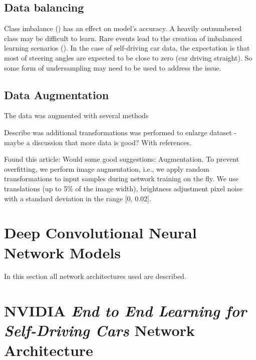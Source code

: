 \subsection{Data balancing}

Class imbalance (\cite{batista2004study}) has an effect on model's accuracy. A heavily outnumbered class may be difficult to learn. Rare events lead to the creation of imbalanced learning scenarios (\cite{krawczyk2016learning}). In the case of self-driving car data, the expectation is that most of steering angles are expected to be close to zero (car driving straight). So some form of undersampling may need to be used to address the issue.






\subsection{Data Augmentation}
The data was augmented with several methods

Describe was additional transformations was performed to enlarge dataset - maybe a discussion that more data is good? With references.


Found this article:
Would some good suggestions:  
Augmentation. To prevent overfitting, we perform image augmentation, i.e., we
apply random transformations to input samples during network training on the
fly. We use translations (up to 5\% of the image width), brightness adjustment
pixel noise with a standard deviation in the range [0, 0.02].
  
\section{Deep Convolutional Neural Network Models}

In this section all network architectures used are described.

\section{NVIDIA \textit{End to End Learning for Self-Driving Cars} Network Architecture}

